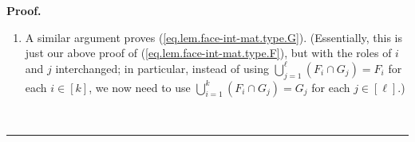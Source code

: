 \documentclass[12pt]{article}
\theoremstyle{definition}%
\theoremstyle{definition}%
\theoremstyle{remark}%
\newcommand{\interval}[1]{\left[ #1 \right]} %
\newcommand{\rowsums}{\operatorname{rowsums}}
\newcommand{\mat}{\operatorname{mat}}
\newcommand{\type}{\operatorname{type}}
\newenvironment{proof}[1][Proof]{\noindent\textbf{#1.} }{\ \rule{0.5em}{0.5em}}
\begin{document}
\begin{proof}
\begin{enumerate}
Fix $i\in\interval{k}  $. Recall that $G=\left(  G_{1},G_{2},
\ldots,G_{\ell}\right)  $ is a face of $\interval{n}$. Hence, the sets
$G_{1},G_{2},\ldots,G_{\ell}$ are disjoint and have union $\bigcup
\limits_{j=1}^{\ell}G_{j}=\interval{n}$. Thus, the intersections
$F_{i}\cap G_{1},\ F_{i}\cap G_{2},\ \ldots,\ F_{i}\cap G_{\ell}$ are also
disjoint and have union
\[
\bigcup\limits_{j=1}^{\ell}\left(  F_{i}\cap G_{j}\right)  =F_{i}
\cap\underbrace{\left(  \bigcup\limits_{j=1}^{\ell}G_{j}\right)  }_{=
\interval{n}}=F_{i}\cap\interval{n}=F_{i}
\]
(since $F_{i}\subseteq\interval{n}$). Hence,
\[
F_{i}=\bigcup\limits_{j=1}^{\ell}\left(  F_{i}\cap G_{j}\right)  ,
\]
so that
\begin{align*}
\left\vert F_{i}\right\vert  &  =\left\vert \bigcup\limits_{j=1}^{\ell}\left(
F_{i}\cap G_{j}\right)  \right\vert =\sum_{j=1}^{\ell}\left\vert F_{i}\cap
G_{j}\right\vert \ \ \ \ \ \ \ \ \ \ \left(
\begin{array}[c]{c}
\text{by the sum rule, since the}\\
\text{sets }F_{i}\cap G_{1},\ F_{i}\cap G_{2},\ \ldots,\ F_{i}\cap G_{\ell}\\
\text{are disjoint}
\end{array}
\right) \\
&  =\sum_{j\in\interval{\ell}}\left\vert F_{i}\cap G_{j}\right\vert
=r_{i}\ \ \ \ \ \ \ \ \ \ \left(  \text{by the definition of }r_{i}\right)  .
\end{align*}
Forget that we fixed $i$. We thus have shown that $\left\vert F_{i}\right\vert
=r_{i}$ for each $i\in\interval{k}  $. Now, from
$F=\left(  F_{1},F_{2},\ldots,F_{k}\right)  $, we obtain
\begin{align*}
\type F  &  =\type \left(  F_{1},F_{2},
\ldots,F_{k}\right) \\
&  =\left(  \left\vert F_{1}\right\vert ,\left\vert F_{2}\right\vert
,\dots,\left\vert F_{k}\right\vert \right)  \ \ \ \ \ \ \ \ \ \ \left(
\text{by the definition of type}\right) \\
&  =\left(  r_{1},r_{2},\ldots,r_{k}\right)  \ \ \ \ \ \ \ \ \ \ \left(
\text{since }\left\vert F_{i}\right\vert =r_{i}\text{ for each }i\in
\interval{k}\right) \\
&  =\rowsums \left(  \mat\left(  F,G\right)
\right)
\end{align*}
(since $\rowsums \left(  \mat\left(  F,G\right)
\right)  $ is defined to be $\left(  r_{1},r_{2},\ldots,r_{k}\right)  $). This
proves (\ref{eq.lem.face-int-mat.type.F}).

\item A similar argument proves (\ref{eq.lem.face-int-mat.type.G}).
(Essentially, this is just our above proof of
(\ref{eq.lem.face-int-mat.type.F}), but with the roles of $i$ and $j$
interchanged; in particular, instead of using $\bigcup\limits_{j=1}^{\ell
}\left(  F_{i}\cap G_{j}\right)  =F_{i}$ for each $i\in\interval{k}  $, we
now need to use $\bigcup\limits_{i=1}^{k}\left(  F_{i}\cap G_{j}\right)
=G_{j}$ for each $j\in\interval{\ell}$.)


\end{enumerate}
\end{proof}
\end{document}
